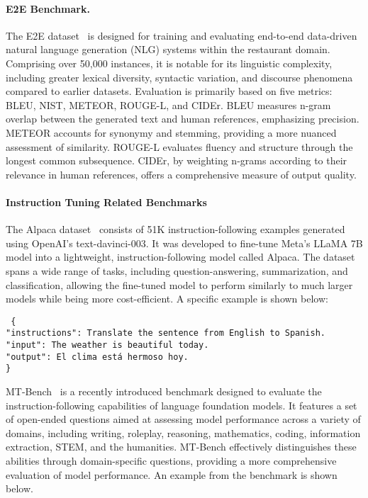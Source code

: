 \paragraph{E2E Benchmark.}
The E2E dataset~\cite{novikova2017e2e} is designed for training and evaluating end-to-end data-driven natural language generation (NLG) systems within the restaurant domain. Comprising over 50,000 instances, it is notable for its linguistic complexity, including greater lexical diversity, syntactic variation, and discourse phenomena compared to earlier datasets. Evaluation is primarily based on five metrics: BLEU, NIST, METEOR, ROUGE-L, and CIDEr. BLEU measures n-gram overlap between the generated text and human references, emphasizing precision. METEOR accounts for synonymy and stemming, providing a more nuanced assessment of similarity. ROUGE-L evaluates fluency and structure through the longest common subsequence. CIDEr, by weighting n-grams according to their relevance in human references, offers a comprehensive measure of output quality.

\paragraph{Instruction Tuning Related Benchmarks}
The Alpaca dataset~\cite{taori2023stanford} consists of 51K instruction-following examples generated using OpenAI's text-davinci-003. It was developed to fine-tune Meta's LLaMA 7B model into a lightweight, instruction-following model called Alpaca. The dataset spans a wide range of tasks, including question-answering, summarization, and classification, allowing the fine-tuned model to perform similarly to much larger models while being more cost-efficient. A specific example is shown below:


\begin{tcolorbox}[colback=green!5!white, colframe=black!75!, sharp corners, boxrule=1pt]
\footnotesize
\texttt{
\{\\
\hspace*{0.5cm} "instructions": Translate the sentence from English to Spanish.\\
\hspace*{0.5cm} "input": The weather is beautiful today.\\
\hspace*{0.5cm} "output": El clima está hermoso hoy.\\
\}
}
\end{tcolorbox}

MT-Bench~\cite{zheng2024judging} is a recently introduced benchmark designed to evaluate the instruction-following capabilities of language foundation models. It features a set of open-ended questions aimed at assessing model performance across a variety of domains, including writing, roleplay, reasoning, mathematics, coding, information extraction, STEM, and the humanities. MT-Bench effectively distinguishes these abilities through domain-specific questions, providing a more comprehensive evaluation of model performance. An example from the benchmark is shown below.

